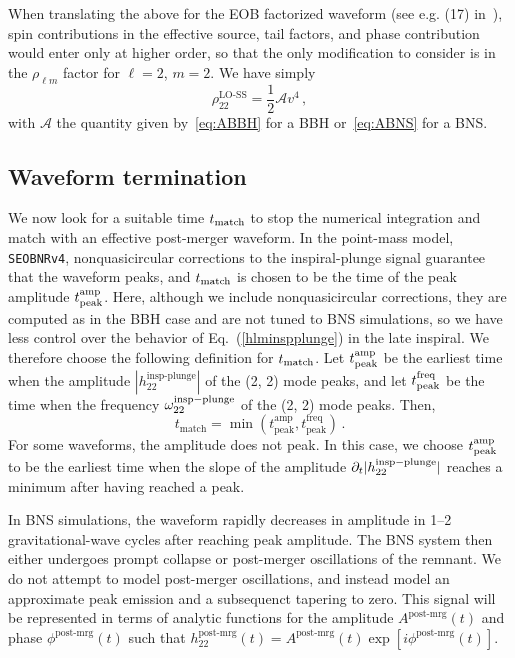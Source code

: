 \documentclass[prd,aps,letter,twocolumn,floatfix,notitlepage,nofootinbib]{revtex4-1}
\newcommand{\be}{\begin{equation}}
\newcommand{\ee}{\end{equation}}
\begin{document}
When translating the above for the EOB factorized waveform (see e.g. (17) in~\cite{Taracchini:2012ig}), spin contributions in the effective source, tail factors, and phase contribution would enter only at higher order, so that the only modification to consider is in the $\rho_{\ell m}$ factor for $\ell = 2$, $m = 2$. We have simply
\be\label{eq:rho22}
	\rho_{22}^{\textrm{LO-SS}} = \frac{1}{2}\mathcal{A} v^{4} \,,
\ee
with $\mathcal{A}$ the quantity given by~\eqref{eq:ABBH} for a BBH or~\eqref{eq:ABNS} for a BNS. 

\subsection{Waveform termination}

We now look for a suitable time $t_{\rm match}$ to stop the numerical integration and match with an effective post-merger waveform. In the point-mass model, \texttt{SEOBNRv4}, nonquasicircular corrections to the inspiral-plunge signal guarantee that the waveform peaks, and $t_{\rm match}$ is chosen to be the time of the peak amplitude $t_{\rm peak}^{\rm amp}$. Here, although we include nonquasicircular corrections, they are computed as in the BBH case and are not tuned to BNS simulations, so we have less control over the behavior of Eq.~(\ref{hlminspplunge}) in the late inspiral. We therefore choose the following definition for $t_{\rm match}$. Let $t_{\rm peak}^{\rm amp}$ be the earliest time when the amplitude $|h_{22}^{\textrm{insp-plunge}}|$ of the (2, 2) mode peaks, and let $t_{\rm peak}^{\rm freq}$ be the time when the frequency $\omega_{22}^{\rm insp-plunge}$ of the (2, 2) mode peaks. Then,
\begin{equation}
t_{\textrm{match}} = \min \left(t_{\textrm{peak}}^{\textrm{amp}},t_{\textrm{peak}}^{\textrm{freq}}\right)\,.\label{tmatch}
\end{equation}
For some waveforms, the amplitude does not peak. In this case, we choose $t_{\rm peak}^{\rm amp}$ to be the earliest time when the slope of the amplitude $\partial_t |h_{22}^{\rm insp-plunge}|$ reaches a minimum after having reached a peak.

In BNS simulations, the waveform rapidly decreases in amplitude in 1--2 gravitational-wave cycles after reaching peak amplitude. The BNS system then either undergoes prompt collapse or post-merger oscillations of the remnant. We do not attempt to model post-merger oscillations, and instead model an approximate peak emission and a subsequenct tapering to zero. This signal will be represented in terms of analytic functions for the amplitude $A^{\textrm{post-mrg}}(t)$ and phase $\phi^{\textrm{post-mrg}}(t)$ such that $h_{22}^{\textrm{post-mrg}}(t) = A^{\textrm{post-mrg}}(t) \exp{[i\phi^{\textrm{post-mrg}}(t)]}$. 
\end{document}
